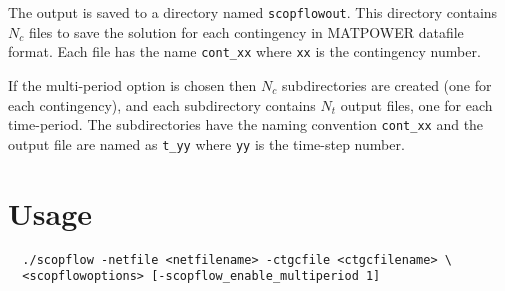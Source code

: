 The \scopflow output is saved to a directory named \texttt{scopflowout}. This
directory contains $N_c$ files to save the solution for each contingency in
MATPOWER datafile format. Each file has the name \texttt{cont_xx} where \texttt{xx} is the contingency number. 

If the multi-period option is chosen then $N_c$ subdirectories are created (one
for each contingency), and each subdirectory contains $N_t$ output files, one
for each time-period. The subdirectories have the naming convention
\texttt{cont_xx} and the output file are named as \texttt{t_yy} where \texttt{yy} is the time-step number.

\section{Usage}

\begin{lstlisting}
  ./scopflow -netfile <netfilename> -ctgcfile <ctgcfilename> \
  <scopflowoptions> [-scopflow_enable_multiperiod 1]
\end{lstlisting}

